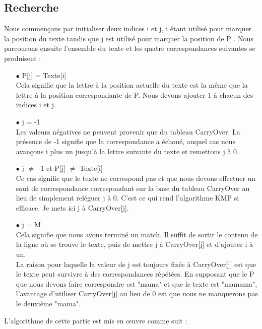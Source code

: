 \documentclass[11pt,english]{article}
\begin{document}
\subsection{Recherche}

\indent 

Nous commençons par initialiser deux indices i et j, i étant utilisé pour marquer la position du texte tandis que j est utilisé pour marquer la position de P .
Nous parcourons ensuite l'ensemble du texte et les quatre correspondances suivantes se produisent :

\begin{itemize}
    \item [$\bullet$] P[j] = Texte[i]
    \\
    Cela signifie que la lettre à la position actuelle du texte est la même que la lettre à la position correspondante de P. Nous devons ajouter 1 à chacun des indices i et j.
    \item [$\bullet$] j = -1
    \\
    Les valeurs négatives ne peuvent provenir que du tableau CarryOver. La présence de -1 signifie que la correspondance a échoué, auquel cas nous avançons i plus un jusqu'à la lettre suivante du texte et remettons j à 0.
    \item [$\bullet$] j $\neq$ -1 et P[j] $\neq$ Texte[i]
    \\
    Ce cas signifie que le texte ne correspond pas et que nous devons effectuer un saut de correspondance correspondant sur la base du tableau CarryOver au lieu de simplement reléguer j à 0. C'est ce qui rend l'algorithme KMP si efficace. Je mets ici j à CarryOver[j].
    \item [$\bullet$] j = M
    \\
    Cela signifie que nous avons terminé un match. Il suffit de sortir le contenu de la ligne où se trouve le texte, puis de mettre j à CarryOver[j] et d'ajouter i à un. 
    \\
    La raison pour laquelle la valeur de j est toujours fixée à CarryOver[j] est que le texte peut survivre à des correspondances répétées. En supposant que le P que nous devons faire correspondre est "mama" et que le texte est "mamama", l'avantage d'utiliser CarryOver[j] au lieu de 0 est que nous ne manquerons pas le deuxième "mama".
\end{itemize}

\indent L'algorithme de cette partie est mis en œuvre comme suit :
\end{document}
